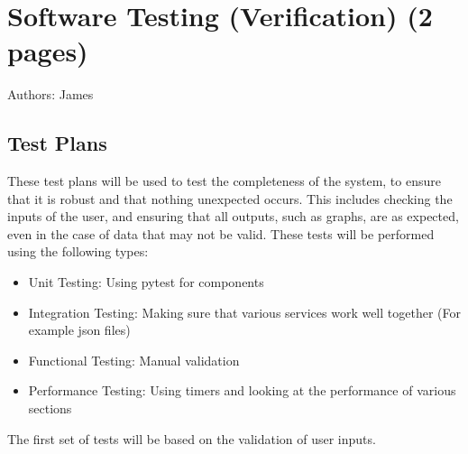 \documentclass[12pt,a4paper]{article}
\begin{document}
\FloatBarrier
\section{Software Testing (Verification) (2 pages)}
Authors: James
\label{sec:testing}

\subsection{Test Plans}
These test plans will be used to test the completeness of the system, to ensure that it is robust and that nothing unexpected occurs. This includes checking the inputs of the user, and ensuring that all outputs, such as graphs, are as expected, even in the case of data that may not be valid. These tests will be performed using the following types:

\begin{itemize}
    \item {Unit Testing}: Using pytest for components
    \item {Integration Testing}: Making sure that various services work well together (For example json files)
    \item {Functional Testing}: Manual validation
    \item {Performance Testing}: Using timers and looking at the performance of various sections
\end{itemize}

The first set of tests will be based on the validation of user inputs.
\end{document}
